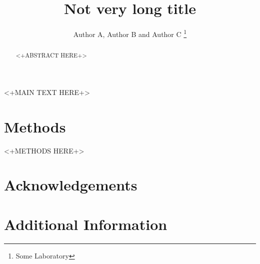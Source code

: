 \documentclass[
    single,             %
    nmat,               %
    letter,             %
    fontsize=10pt,      %
    twocolumn           %
    ]{nature2}          %
\title{Not very long title}
\author{Author A, Author B and Author C
\thanks{Some Laboratory}}
\begin{document}
\maketitle

\begin{abstract}
    <+ABSTRACT HERE+>
\end{abstract}

<+MAIN TEXT HERE+>

\section{Methods}

<+METHODS HERE+>

%



\section{Acknowledgements}

\section{Additional Information}
\end{document}
